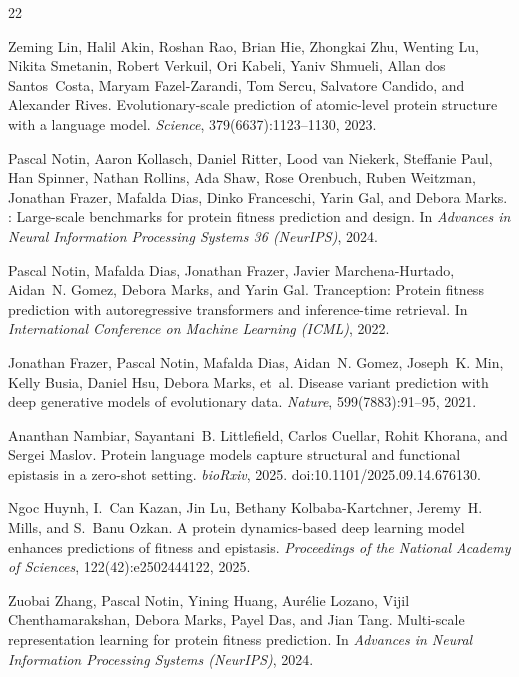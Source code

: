 \documentclass{article}
\begin{document}
\begin{thebibliography}{22}

Zeming Lin, Halil Akin, Roshan Rao, Brian Hie, Zhongkai Zhu, Wenting Lu, Nikita Smetanin, Robert Verkuil, Ori Kabeli, Yaniv Shmueli, Allan dos Santos~Costa, Maryam Fazel-Zarandi, Tom Sercu, Salvatore Candido, and Alexander Rives.
\newblock Evolutionary-scale prediction of atomic-level protein structure with a language model.
\newblock \emph{Science}, 379(6637):1123--1130, 2023.

Pascal Notin, Aaron Kollasch, Daniel Ritter, Lood van Niekerk, Steffanie Paul, Han Spinner, Nathan Rollins, Ada Shaw, Rose Orenbuch, Ruben Weitzman, Jonathan Frazer, Mafalda Dias, Dinko Franceschi, Yarin Gal, and Debora Marks.
: Large-scale benchmarks for protein fitness prediction and design.
\newblock In \emph{Advances in Neural Information Processing Systems 36 (NeurIPS)}, 2024.

Pascal Notin, Mafalda Dias, Jonathan Frazer, Javier Marchena-Hurtado, Aidan~N. Gomez, Debora Marks, and Yarin Gal.
\newblock Tranception: Protein fitness prediction with autoregressive transformers and inference-time retrieval.
\newblock In \emph{International Conference on Machine Learning (ICML)}, 2022.

Jonathan Frazer, Pascal Notin, Mafalda Dias, Aidan~N. Gomez, Joseph~K. Min, Kelly Busia, Daniel Hsu, Debora Marks, et~al.
\newblock Disease variant prediction with deep generative models of evolutionary data.
\newblock \emph{Nature}, 599(7883):91--95, 2021.

Ananthan Nambiar, Sayantani~B. Littlefield, Carlos Cuellar, Rohit Khorana, and Sergei Maslov.
\newblock Protein language models capture structural and functional epistasis in a zero-shot setting.
\newblock \emph{bioRxiv}, 2025.
\newblock doi:10.1101/2025.09.14.676130.

Ngoc Huynh, I.~Can Kazan, Jin Lu, Bethany Kolbaba-Kartchner, Jeremy~H. Mills, and S.~Banu Ozkan.
\newblock A protein dynamics-based deep learning model enhances predictions of fitness and epistasis.
\newblock \emph{Proceedings of the National Academy of Sciences}, 122(42):e2502444122, 2025.

Zuobai Zhang, Pascal Notin, Yining Huang, Aur{\'e}lie Lozano, Vijil Chenthamarakshan, Debora Marks, Payel Das, and Jian Tang.
\newblock Multi-scale representation learning for protein fitness prediction.
\newblock In \emph{Advances in Neural Information Processing Systems (NeurIPS)}, 2024.


\end{thebibliography}
\end{document}
